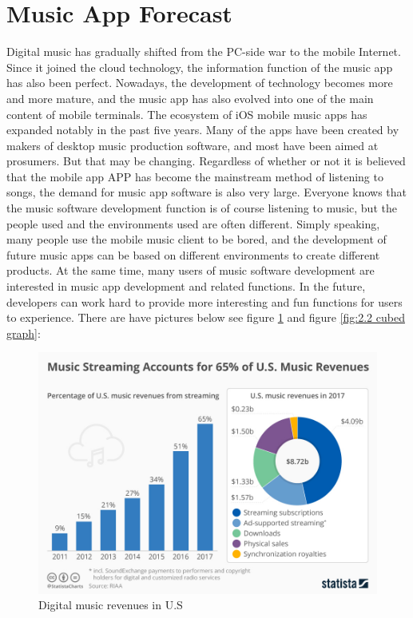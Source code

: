 \section{Music App Forecast}
Digital music has gradually shifted from the PC-side war to the mobile Internet. Since it joined the cloud technology, the information function of the music app has also been perfect. Nowadays, the development of technology becomes more and more mature, and the music app has also evolved into one of the main content of mobile terminals. The ecosystem of iOS mobile music apps has expanded notably in the past five years. Many of the apps have been created by makers of desktop music production software, and most have been aimed at prosumers. But that may be changing. Regardless of whether or not it is believed that the mobile app APP has become the mainstream method of listening to songs, the demand for music app software is also very large. Everyone knows that the music software development function is of course listening to music, but the people used and the environments used are often different. Simply speaking, many people use the mobile music client to be bored, and the development of future music apps can be based on different environments to create different products. At the same time, many users of music software development are interested in music app development and related functions. In the future, developers can work hard to provide more interesting and fun functions for users to experience.
There are have pictures below see figure \ref{fig:2.1 cubed graph} and figure \ref{fig:2.2 cubed graph}:
\begin{figure}[h]
	\centering
	\includegraphics[scale=0.3]{img/forecast.png}
	\caption{Digital music revenues in U.S}
	\label{fig:2.1 cubed graph}
\end{figure}

